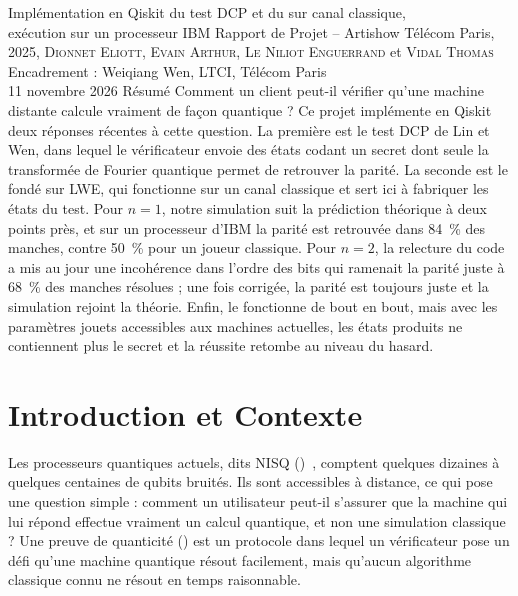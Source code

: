 \newcommand{\langue}{french}


{Implémentation en Qiskit du test DCP et du  sur canal classique,\\ exécution sur un processeur IBM}
{Rapport de Projet -- Artishow}
{Télécom Paris, 2025, \textsc{Dionnet Eliott}, \textsc{Evain Arthur}, \textsc{Le Niliot Enguerrand} et \textsc{Vidal Thomas}\\
Encadrement : Weiqiang Wen, LTCI, Télécom Paris\\
11 novembre 2026}
{Résumé}
{Comment un client peut-il vérifier qu'une machine distante calcule vraiment de façon quantique ? Ce projet
implémente en Qiskit deux réponses récentes à cette question. La première est le test DCP de Lin et Wen,
dans lequel le vérificateur envoie des états codant un secret dont seule la transformée de Fourier quantique
permet de retrouver la parité. La seconde est le  fondé sur LWE, qui fonctionne
sur un canal classique et sert ici à fabriquer les états du test. Pour $n = 1$, notre simulation suit la prédiction
théorique à deux points près, et sur un processeur d'IBM la parité est retrouvée dans 84~\% des manches, contre
50~\% pour un joueur classique. Pour $n = 2$, la relecture du code a mis au jour une incohérence dans l'ordre des
bits qui ramenait la parité juste à 68~\% des manches résolues ; une fois corrigée, la parité est toujours juste et
la simulation rejoint la théorie. Enfin, le  fonctionne de bout en bout, mais avec les paramètres
jouets accessibles aux machines actuelles, les états produits ne contiennent plus le secret et la réussite retombe
au niveau du hasard.}

\section{Introduction et Contexte}
Les processeurs quantiques actuels, dits NISQ ()~\cite{preskill}, comptent quelques dizaines à quelques centaines de qubits bruités. Ils sont
accessibles à distance, ce qui pose une question simple :
comment un utilisateur peut-il s'assurer que la machine
qui lui répond effectue vraiment un calcul quantique,
et non une simulation classique ? Une preuve de quanticité () est un protocole dans lequel un vérificateur pose un
défi qu'une machine quantique résout facilement, mais
qu'aucun algorithme classique connu ne résout en temps raisonnable.

